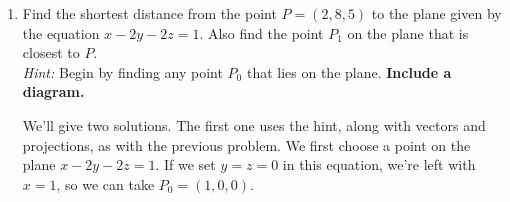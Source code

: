 \documentclass[12pt]{article}
\newcommand{\len}[1]{\lVert #1\rVert}
\newcommand{\dotp}{\boldsymbol{\cdot}}
\newcommand{\bbm}{\begin{bmatrix}}
\newcommand{\ebm}{\end{bmatrix}}
\begin{document}
\begin{enumerate}
{\bf Note:} if we wanted only the distance but didn't need to find the point $P_1$, we can notice (from -- guess what? -- the diagram!) that the distance from the point $P$ to the line is given by the length of the vector $\overrightarrow{P_1P}$, and that 
\[
\overrightarrow{P_1P} = \overrightarrow{P_0P}-\overrightarrow{P_0P_1} = \bbm -1\\3\\-1\ebm - \bbm -2\\2\\0\ebm = \bbm 1\\1\\ -1\ebm,
\]
and thus $d = \len{\overrightarrow{P_1P}} = \sqrt{1^2+1^2+(-1)^2} = \sqrt{3}$.

\pagebreak

Two observations: first, note that if we let $\vec{u}=\overrightarrow{P_0P}$, then we have the orthogonal decomposition $\vec{u}=\vec{u}_1+\vec{u}_2$ just as in the first problem, where $\vec{u}_1 = \overrightarrow{P_0P_1}$ and $\vec{u}_2 = \overrightarrow{P_1P}$, so once we've set up our diagram, Problem 3 is turned into Problem 1, which we already know how to solve. Second, note that our diagram isn't actually accurate:   since $\vec{v}\dotp \overrightarrow{P_0P}$ is negative, the projection of $\overrightarrow{P_0P}$ onto $\vec{v}$ actually points in the opposite direction from $\vec{v}$. However, this fact doesn't in any way effect the ability of our diagram to help us solve the problem -- it's just there as a visual aid to help us set up the equations we need to solve.

\bigskip

\item Find the shortest distance from the point $P=(2,8,5)$ to the plane given by the equation $x-2y-2z=1$. Also find the point $P_1$ on the plane that is closest to $P$. \\
{\em Hint:} Begin by finding any point $P_0$ that lies on the plane. {\bf Include a diagram.}

\bigskip

\begin{multicols}{2}
We'll give two solutions. The first one uses the hint, along with vectors and projections, as with the previous problem.  We first choose a point on the plane $x-2y-2z=1$. If we set $y=z=0$ in this equation, we're left with $x=1$, so we can take $P_0=(1,0,0)$.  
\columnbreak


\end{multicols}
\end{enumerate}
\end{document}
